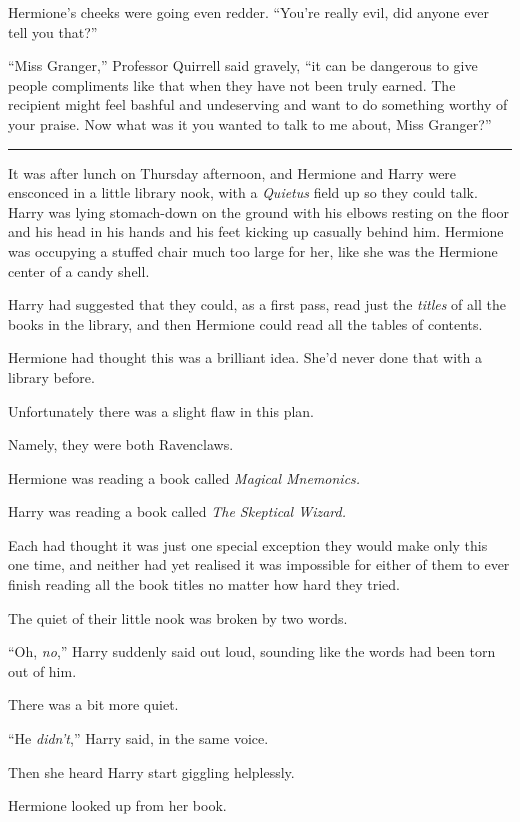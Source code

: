 Hermione's cheeks were going even redder. ``You're really evil, did
anyone ever tell you that?''

``Miss Granger,'' Professor Quirrell said gravely, ``it can be dangerous
to give people compliments like that when they have not been truly
earned. The recipient might feel bashful and undeserving and want to do
something worthy of your praise. Now what was it you wanted to talk to
me about, Miss Granger?''

\begin{center}\rule{3in}{0.4pt}\end{center}

It was after lunch on Thursday afternoon, and Hermione and Harry were
ensconced in a little library nook, with a \emph{Quietus} field up so
they could talk. Harry was lying stomach-down on the ground with his
elbows resting on the floor and his head in his hands and his feet
kicking up casually behind him. Hermione was occupying a stuffed chair
much too large for her, like she was the Hermione center of a candy
shell.

Harry had suggested that they could, as a first pass, read just the
\emph{titles} of all the books in the library, and then Hermione could
read all the tables of contents.

Hermione had thought this was a brilliant idea. She'd never done that
with a library before.

Unfortunately there was a slight flaw in this plan.

Namely, they were both Ravenclaws.

Hermione was reading a book called \emph{Magical Mnemonics.}

Harry was reading a book called \emph{The Skeptical Wizard.}

Each had thought it was just one special exception they would make only
this one time, and neither had yet realised it was impossible for either
of them to ever finish reading all the book titles no matter how hard
they tried.

The quiet of their little nook was broken by two words.

``Oh, \emph{no},'' Harry suddenly said out loud, sounding like the words
had been torn out of him.

There was a bit more quiet.

``He \emph{didn't},'' Harry said, in the same voice.

Then she heard Harry start giggling helplessly.

Hermione looked up from her book.

